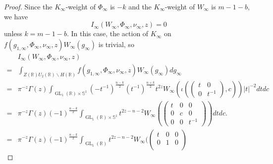 \documentclass[11pt, a4paper]{amsart}
\theoremstyle{plain}
\theoremstyle{definition}
\numberwithin{equation}{section}
\def\RR{\mathbb{R}}
\DeclareMathOperator{\GL}{\mathrm{GL}}
\begin{document}
\begin{proof}
    \par Since the $K_{\infty}$-weight of $\Phi_{\infty}$ is $-k$ and the $K_{\infty}$-weight of $W_{\infty}$ is $m - 1 - b$, we have
    \begin{equation*}
        I_{\infty}(W_{\infty}, \Phi_{\infty}, \nu_{\infty}, z) = 0
    \end{equation*}
    unless $k = m - 1 -b$. In this case, the action of $K_{\infty}$ on $f(g_{1, \infty}, \Phi_{\infty}, \nu_{\infty}, z)W_{\infty}(g_{\infty})$ is trivial, so
    \begin{align}
        & I_{\infty}(W_{\infty}, \Phi_{\infty}, \nu_{\infty}, z) \\ = & \int_{Z(\RR)U_{2}(\RR) \backslash H(\RR)} f(g_{1, \infty}, \Phi_{\infty}, \nu_{\infty}, z) W_{\infty}(g_{\infty}) dg_{\infty} \\ 
        = & \pi^{-z}\Gamma(z) \int_{\GL_1(\RR) \times \mathbb{S}^{1}} (-t^{-1})^{\frac{n-k}{2}} (t^{-1})^{\frac{n+k}{2}} t^{2z} W_{\infty}(\iota( \begin{pmatrix}
            t & 0 \\
            0 & t^{-1} 
        \end{pmatrix}, c)) |t|^{-2} dt dc  \\
        = & \pi^{-z}\Gamma(z) (-1)^{\frac{n - k}{2}}  \int_{\GL_1(\RR) \times \mathbb{S}^{1}}t^{2z - n - 2} W_{\infty}( \begin{pmatrix}
                                                                                                                            t & 0 & 0 \\
                                                                                                                            0 & c & 0 \\
                                                                                                                            0 & 0 & t^{-1} 
                                                                                                                        \end{pmatrix}) dt dc. \\ 
        \label{eqn: Arch_Zeta_Int} = & \pi^{-z}\Gamma(z) (-1)^{\frac{n - k}{2}} \int_{\GL_1(\RR)} t^{2z - n - 2} W_{\infty}( \begin{pmatrix}
                                                                                                    t & 0 & 0 \\
                                                                                                    0 & 1 & 0 \\

\end{pmatrix}
\end{align}
\end{proof}
\end{document}
